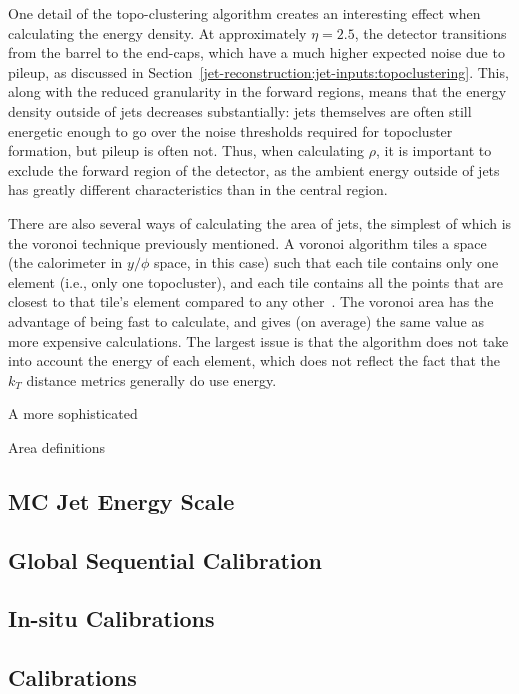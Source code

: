 One detail of the topo-clustering algorithm creates an interesting effect when calculating the energy density. At approximately $\eta = 2.5$, the detector transitions from the barrel to the end-caps, which have a much higher expected noise due to pileup, as discussed in Section~\ref{jet-reconstruction:jet-inputs:topoclustering}. This, along with the reduced granularity in the forward regions, means that the energy density outside of jets decreases substantially: jets themselves are often still energetic enough to go over the noise thresholds required for topocluster formation, but pileup is often not. Thus, when calculating $\rho$, it is important to exclude the forward region of the detector, as the ambient energy outside of jets has greatly different characteristics than in the central region.

There are also several ways of calculating the area of jets, the simplest of which is the voronoi technique previously mentioned. A voronoi algorithm tiles a space (the calorimeter in $y/\phi$ space, in this case) such that each tile contains only one element (i.e., only one topocluster), and each tile contains all the points that are closest to that tile's element compared to any other~\cite{catchmentarea}. The voronoi area has the advantage of being fast to calculate, and gives (on average) the same value as more expensive calculations. The largest issue is that the algorithm does not take into account the energy of each element, which does not reflect the fact that the $k_T$ distance metrics generally do use energy.

A more sophisticated 

Area definitions


\subsection{MC Jet Energy Scale}

\subsection{Global Sequential Calibration}

\subsection{In-situ Calibrations}

\subsection{\LargeR Calibrations}


